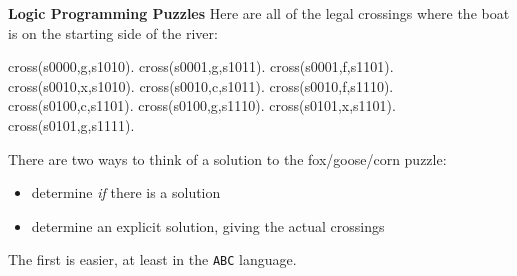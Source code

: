 \begin{minipage}[t]{\sw}
\slidenumber
\LARGE
{\bf Logic Programming Puzzles}\exx
Here are all of the legal crossings where the boat
is on the starting side of the river:
{\Large
\begin{qv}
cross(s0000,g,s1010).
cross(s0001,g,s1011).
cross(s0001,f,s1101).
cross(s0010,x,s1010). %
cross(s0010,c,s1011).
cross(s0010,f,s1110).
cross(s0100,c,s1101).
cross(s0100,g,s1110).
cross(s0101,x,s1101). %
cross(s0101,g,s1111).
\end{qv}
}
There are two ways to think of a solution to the fox/goose/corn puzzle:
\begin{itemize}
\itemsep -0.1in
\item determine {\em if} there is a solution
\item determine an explicit solution, giving the actual crossings
\end{itemize}
The first is easier, at least in the \verb'ABC' language.\exx
\end{minipage}
